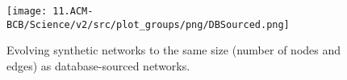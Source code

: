     	\begin{figure}[H]%
    			\centering
    					\texttt{[image: 11.ACM-BCB/Science/v2/src/plot\_groups/png/DBSourced.png]}
    					\caption
                            {
                                Evolving synthetic networks to the same size (number of nodes and edges)  as database-sourced networks.
                            }
    					\label{fig:sim_evo_db}
    	\end{figure}
\clearpage %

